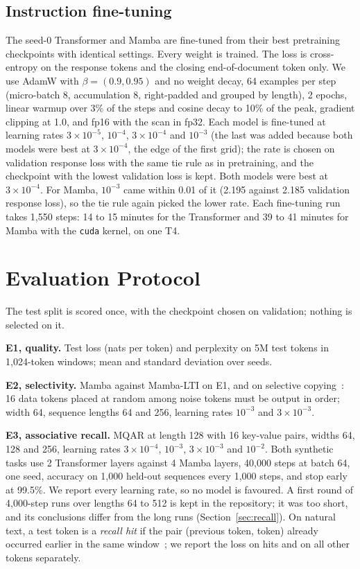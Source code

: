 \documentclass[conference]{IEEEtran}
\begin{document}
\subsection{Instruction fine-tuning}
The seed-0 Transformer and Mamba are fine-tuned from their best pretraining checkpoints with identical
settings. Every weight is trained. The loss is cross-entropy on the response tokens and the closing
end-of-document token only. We use AdamW with $\beta = (0.9, 0.95)$ and no weight decay, 64 examples per
step (micro-batch 8, accumulation 8, right-padded and grouped by length), 2 epochs, linear warmup over
3\% of the steps and cosine decay to 10\% of the peak, gradient clipping at 1.0, and fp16 with the scan
in fp32. Each model is fine-tuned at learning rates $3\times10^{-5}$, $10^{-4}$, $3\times10^{-4}$ and
$10^{-3}$ (the last was added because both models were best at $3\times10^{-4}$, the edge of the first
grid); the rate is chosen on validation response loss with the same tie rule as in pretraining, and the checkpoint
with the lowest validation loss is kept. Both models were best at $3\times10^{-4}$. For Mamba,
$10^{-3}$ came within 0.01 of it (2.195 against 2.185 validation response loss), so the tie rule again
picked the lower rate. Each fine-tuning run takes 1,550 steps: 14 to 15 minutes for the Transformer and
39 to 41 minutes for Mamba with the \texttt{cuda} kernel, on one T4.

\section{Evaluation Protocol}

The test split is scored once, with the checkpoint chosen on validation; nothing is selected on it.

\textbf{E1, quality.} Test loss (nats per token) and perplexity on 5M test tokens in 1,024-token
windows; mean and standard deviation over seeds.

\textbf{E2, selectivity.} Mamba against Mamba-LTI on E1, and on selective copying~\cite{gu2023mamba}:
16 data tokens placed at random among noise tokens must be output in order; width 64, sequence lengths
64 and 256, learning rates $10^{-3}$ and $3\times10^{-3}$.

\textbf{E3, associative recall.} MQAR at length 128 with 16 key-value pairs, widths 64, 128 and 256,
learning rates $3\times10^{-4}$, $10^{-3}$, $3\times10^{-3}$ and $10^{-2}$. Both synthetic tasks use
2 Transformer layers against 4 Mamba layers, 40,000 steps at batch 64, one seed, accuracy on 1,000
held-out sequences every 1,000 steps, and stop early at 99.5\%. We report every learning rate, so no
model is favoured. A first round of 4,000-step runs over lengths 64 to 512 is kept in the repository;
it was too short, and its conclusions differ from the long runs (Section~\ref{sec:recall}). On natural text,
a test token is a \emph{recall hit} if the pair (previous token, token) already occurred earlier in
the same window~\cite{arora2023zoology}; we report the loss on hits and on all other tokens separately.
\end{document}
